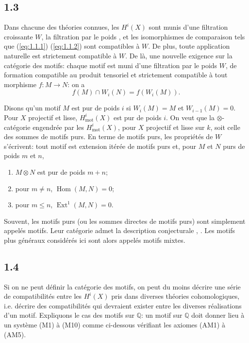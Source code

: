 \documentclass[12pt,a4paper]{article}
\theoremstyle{plain}
\theoremstyle{definition}
\theoremstyle{remark}
\DeclareMathOperator{\Hom}{Hom}
\DeclareMathOperator{\Ext}{Ext}
\newcommand{\mot}{\mathrm{mot}}
\providecommand{\Hom}{\operatorname{Hom}}
\providecommand{\Ext}{\operatorname{Ext}}
\providecommand{\mot}{\mathrm{mot}}
\begin{document}
\subsection*{1.3}

Dans chacune des th\'eories connues, les $H^i(X)$ sont munis d'une filtration croissante
$W$, la filtration par le poids \cite{D5}, et les isomorphismes de comparaison tels que
(\ref{eq:1.1.1}) (\ref{eq:1.1.2}) sont compatibles \`a $W$. De plus, toute application
naturelle est strictement compatible \`a $W$. De l\`a, une nouvelle exigence sur la
cat\'egorie des motifs: chaque motif est muni d'une filtration par le poids $W$, de
formation compatible au produit tensoriel et strictement compatible \`a tout morphisme
$f: M \to N$: on a
\[
f(M) \cap W_i(N) = f(W_i(M)).
\]

Disons qu'un motif $M$ est pur de poids $i$ si $W_i(M) = M$ et $W_{i-1}(M) = 0$. Pour
$X$ projectif et lisse, $H^i_\mot(X)$ est pur de poids $i$. On veut que la
$\otimes$-cat\'egorie engendr\'ee par les $H^i_\mot(X)$, pour $X$ projectif et lisse sur
$k$, soit celle des sommes de motifs purs. En terme de motifs purs, les propri\'et\'es de
$W$ s'\'ecrivent: tout motif est extension it\'er\'ee de motifs purs et, pour $M$ et $N$
purs de poids $m$ et $n$,
\begin{enumerate}[label=(\alph*)]
\item $M \otimes N$ est pur de poids $m + n$;
\item pour $m \neq n$, $\Hom(M,N) = 0$;
\item pour $m \leq n$, $\Ext^1(M,N) = 0$.
\end{enumerate}

Souvent, les motifs purs (ou les sommes directes de motifs purs) sont simplement
appel\'es motifs. Leur cat\'egorie admet la description conjecturale \cite{Kl}, \cite{Man}.
Les motifs plus g\'en\'eraux consid\'er\'es ici sont alors appel\'es motifs mixtes.

\subsection*{1.4}

Si on ne peut d\'efinir la cat\'egorie des motifs, on peut du moins d\'ecrire une s\'erie
de compatibilit\'es entre les $H^i(X)$ pris dans diverses th\'eories cohomologiques, i.e.
d\'ecrire des compatibilit\'es qui devraient exister entre les diverses r\'ealisations d'un
motif. Expliquons le cas des motifs sur $\mathbb{Q}$: un motif sur $\mathbb{Q}$ doit donner
lieu \`a un syst\`eme (M1) \`a (M10) comme ci-dessous v\'erifiant les axiomes (AM1) \`a (AM5).
\end{document}

